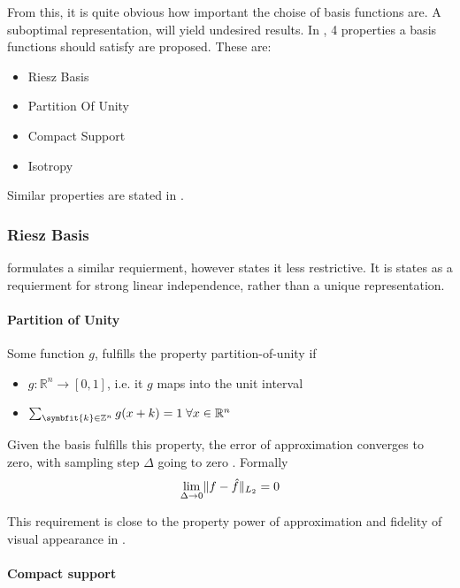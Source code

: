 From this, it is quite obvious how important the choise of basis functions are. 
A suboptimal representation, will yield undesired results. In \cite{nilchian_optimized_2015}, 4 
properties a basis functions should satisfy are proposed. These are:
\begin{itemize}
    \item Riesz Basis
    \item Partition Of Unity
    \item Compact Support
    \item Isotropy
\end{itemize}

Similar properties are stated in \cite{hanson_local_1985}.

\subsubsection{Riesz Basis}


\cite{hanson_local_1985} formulates a similar requierment, however states it less restrictive. It is
states as a requierment for strong linear independence, rather than a unique representation.
 
\paragraph{Partition of Unity}
 
Some function $g$, fulfills the property partition-of-unity if
\begin{itemize}
    \item $g: \mathbb{R}^n \to [0, 1]$, i.e. it $g$ maps into the unit interval
    \item $\sum_{\symbfit{k} \in \mathbb{Z}^n} g(x + k) = 1 \; \forall x \in \mathbb{R}^n$
\end{itemize}
Given the basis fulfills this property, the error of approximation converges to zero, with sampling 
step $\Delta$ going to zero \cite{nilchian_optimized_2015}. Formally
\begin{equation}
    \lim_{\Delta \to 0} \lVert f - \hat{f}\rVert_{L_2} = 0
\end{equation}

This requirement is close to the property power of approximation and fidelity of visual
appearance in \cite{hanson_local_1985}.

\paragraph{Compact support}

